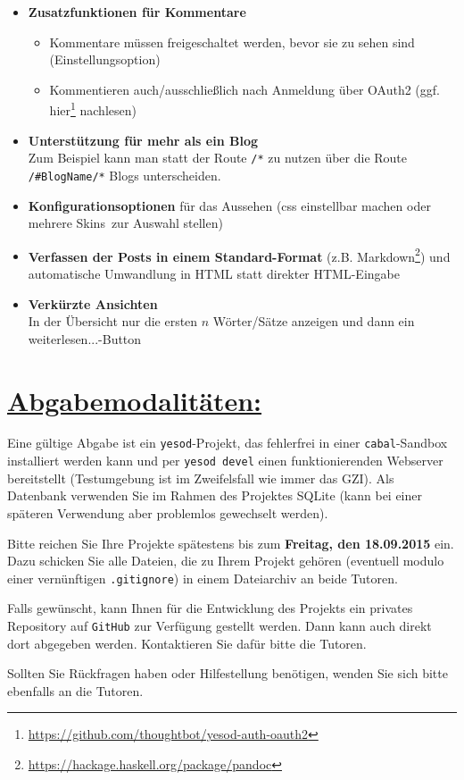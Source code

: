 \documentclass[10pt,a4paper]{article}
\begin{document}
\begin{itemize}
 \item \textbf{Zusatzfunktionen für Kommentare}
       \begin{itemize}
        \item Kommentare müssen freigeschaltet werden, bevor sie zu sehen sind (Einstellungsoption)
        \item Kommentieren auch/ausschließlich nach Anmeldung über OAuth2 (ggf. hier\footnote{\url{https://github.com/thoughtbot/yesod-auth-oauth2}} nachlesen)
       \end{itemize}
 \item \textbf{Unterstützung für mehr als ein Blog}\\
       Zum Beispiel kann man statt der Route \texttt{/*} zu nutzen über die Route \texttt{/\#BlogName/*} Blogs unterscheiden.
 \item \textbf{Konfigurationsoptionen} für das Aussehen (css einstellbar machen oder mehrere \glqq Skins\grqq \ zur Auswahl stellen)
 \item \textbf{Verfassen der Posts in einem Standard-Format} (z.B. Markdown\footnote{\url{https://hackage.haskell.org/package/pandoc}}) und automatische Umwandlung in HTML statt direkter HTML-Eingabe
 \item \textbf{Verkürzte Ansichten}\\ In der Übersicht nur die ersten $n$ Wörter/Sätze anzeigen und dann ein \glqq weiterlesen...\grqq-Button
\end{itemize}

\section*{\underline{Abgabemodalitäten:}}

Eine gültige Abgabe ist ein \texttt{yesod}-Projekt, das fehlerfrei in einer \texttt{cabal}-Sandbox installiert werden kann und per \texttt{yesod devel} einen funktionierenden Webserver bereitstellt (Testumgebung ist im Zweifelsfall wie immer das GZI). Als Datenbank verwenden Sie im Rahmen des Projektes SQLite (kann bei einer späteren Verwendung aber problemlos gewechselt werden).

Bitte reichen Sie Ihre Projekte spätestens bis zum \textbf{Freitag, den 18.09.2015} ein.
Dazu schicken Sie alle Dateien, die zu Ihrem Projekt gehören (eventuell modulo einer vernünftigen \texttt{.gitignore}) in einem Dateiarchiv an beide Tutoren.\bigskip

Falls gewünscht, kann Ihnen für die Entwicklung des Projekts ein privates Repository auf \texttt{GitHub} zur Verfügung gestellt werden. Dann kann auch direkt dort abgegeben werden. Kontaktieren Sie dafür bitte die Tutoren.\bigskip

Sollten Sie Rückfragen haben oder Hilfestellung benötigen, wenden Sie sich bitte ebenfalls an die Tutoren.
\end{document}
